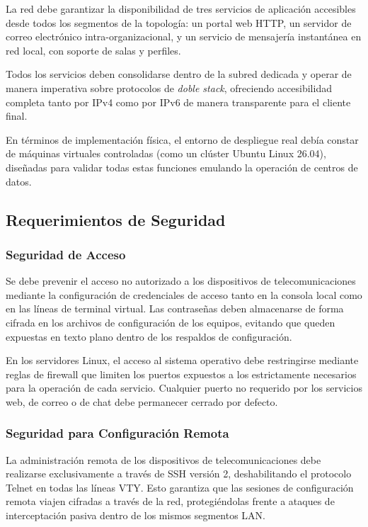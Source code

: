 La red debe garantizar la disponibilidad de tres servicios de aplicación
accesibles desde todos los segmentos de la topología: un portal web HTTP,
un servidor de correo electrónico intra-organizacional, y un servicio
de mensajería instantánea en red local, con soporte de salas y perfiles.

Todos los servicios deben consolidarse dentro de la subred dedicada y
operar de manera imperativa sobre protocolos de \textit{doble stack}, 
ofreciendo accesibilidad completa tanto por IPv4 como por IPv6 de manera
transparente para el cliente final. 

En términos de implementación física, el entorno de despliegue real debía constar
de máquinas virtuales controladas (como un clúster Ubuntu Linux 26.04), diseñadas 
para validar todas estas funciones emulando la operación de centros de datos.

\subsection{Requerimientos de Seguridad}

\subsubsection{Seguridad de Acceso}

Se debe prevenir el acceso no autorizado a los dispositivos de telecomunicaciones
mediante la configuración de credenciales de acceso tanto en la consola local como
en las líneas de terminal virtual. Las contraseñas deben almacenarse de forma
cifrada en los archivos de configuración de los equipos, evitando que queden
expuestas en texto plano dentro de los respaldos de configuración.

En los servidores Linux, el acceso al sistema operativo debe restringirse mediante
reglas de firewall que limiten los puertos expuestos a los estrictamente necesarios
para la operación de cada servicio. Cualquier puerto no requerido por los servicios
web, de correo o de chat debe permanecer cerrado por defecto.

\subsubsection{Seguridad para Configuración Remota}

La administración remota de los dispositivos de telecomunicaciones debe realizarse
exclusivamente a través de SSH versión 2, deshabilitando el protocolo Telnet en
todas las líneas VTY. Esto garantiza que las sesiones de configuración remota
viajen cifradas a través de la red, protegiéndolas frente a ataques de
interceptación pasiva dentro de los mismos segmentos LAN.

